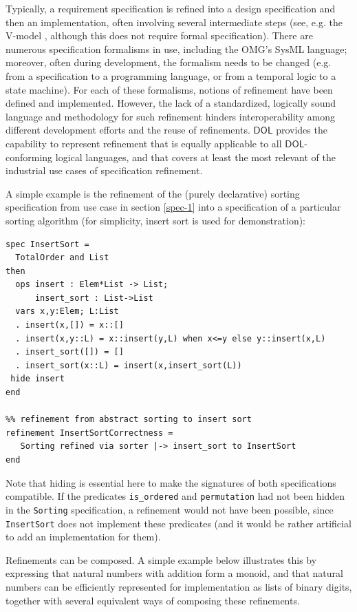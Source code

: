 \documentclass[10pt,fleqn,final]{scrreprt}
\newcommand*{\DOL}{\ensuremath{\mathsf{DOL}}\xspace}
\newenvironment{definitions}[0]{\medskip }{}
\begin{document}
\begin{definitions}
Typically, a requirement specification is refined into a
design specification and then an implementation, often involving
several intermediate steps (see, e.g. the V-model \cite{V-model}, although
this does not require formal specification).  There are numerous
specification formalisms in use, including the OMG's SysML language;
moreover, often during development, the formalism needs to be changed
(e.g. from a specification to a programming language, or from a
temporal logic to a state machine). For each of these formalisms,
notions of refinement have been defined and implemented. However, the
lack of a standardized, logically sound language and methodology for
such refinement hinders interoperability among different development
efforts and the reuse of refinements.  \DOL provides the capability to
represent refinement that is equally applicable to all \DOL-conforming
logical languages, and that covers at least the most relevant of the
industrial use cases of specification refinement.

A simple example is the refinement of the (purely declarative) sorting
specification from use case in section \ref{spec-1} into a specification of a particular sorting
algorithm (for simplicity, insert sort is used for demonstration):

\begin{lstlisting}[basicstyle=\ttfamily\footnotesize,language=dolText,alsolanguage=CASL,escapechar=@,mathescape]	
spec InsertSort = 
  TotalOrder and List
then
  ops insert : Elem*List -> List;
      insert_sort : List->List
  vars x,y:Elem; L:List
  . insert(x,[]) = x::[]
  . insert(x,y::L) = x::insert(y,L) when x<=y else y::insert(x,L)
  . insert_sort([]) = []
  . insert_sort(x::L) = insert(x,insert_sort(L))
 hide insert
end

%% refinement from abstract sorting to insert sort
refinement InsertSortCorrectness =
   Sorting refined via sorter |-> insert_sort to InsertSort
end
\end{lstlisting}
Note that hiding is essential here to make the signatures of
both specifications compatible. If  the
predicates \texttt{is\_ordered} and \texttt{permutation}
had not been hidden in the \texttt{Sorting} specification, a refinement would
not have been possible, since \texttt{InsertSort} does not
implement these predicates (and it would be rather artificial
to add an implementation for them).

\medskip

Refinements can be composed. A simple example below illustrates this
by expressing that natural numbers with addition form a monoid, and
that natural numbers can be efficiently represented for implementation
as lists of binary digits, together with several equivalent ways of
composing these refinements.


\end{definitions}
\end{document}
